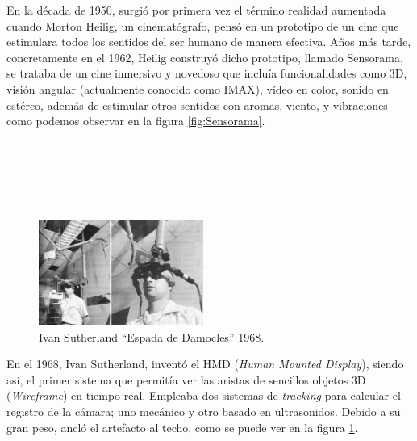 En la década de 1950, surgió por primera vez el término realidad aumentada cuando Morton Heilig, un cinematógrafo, pensó en un prototipo de un cine que estimulara todos los sentidos del ser humano de manera efectiva. Años más tarde, concretamente en el 1962, Heilig construyó dicho prototipo, llamado Sensorama, se trataba de un cine inmersivo y novedoso que incluía funcionalidades como 3D, visión angular (actualmente conocido como IMAX), vídeo en color, sonido en estéreo, además de estimular otros sentidos con aromas, viento, y vibraciones como podemos observar en la figura \ref{fig:Sensorama}.\\
\\
\\
\\
\\
\\

\begin{figure}
    \centering
    \includegraphics[width=0.48\textwidth]{Images/HumanMountDisplay.png}
    \caption{Ivan Sutherland “Espada de Damocles” 1968.}
    \label{fig:EspadaDamocles}
\end{figure}

En el 1968, Ivan Sutherland, inventó el HMD (\textit{Human Mounted Display}), siendo así, el primer sistema que permitía ver las aristas de sencillos objetos 3D (\textit{Wireframe}) en tiempo real. Empleaba dos sistemas de \textit{tracking} para calcular el registro de la cámara; uno mecánico y otro basado en ultrasonidos. Debido a su gran peso, ancló el artefacto al techo, como se puede ver en la figura \ref{fig:EspadaDamocles}.
\\
\\
\\
\\
\\
\\


